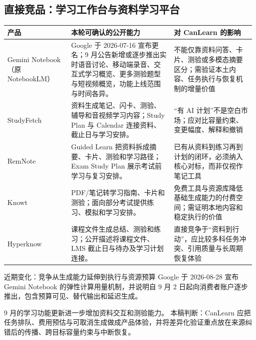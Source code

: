 \documentclass[UTF8,a4paper,11pt,fontset=none]{ctexart}
\newcommand{\cth}[1]{\textbf{\sffamily #1}}
\newcommand{\cont}[1]{\clearpage\noindent{\small\sffamily\color{Muted}#1}\par\vspace{3pt}}
\newenvironment{tbl}{\par\vspace{3pt}\small\noindent\ignorespaces}{\unskip\par\vspace{5pt}}
\begin{document}
\subsection{直接竞品：学习工作台与资料学习平台}
\begin{tbl}
\begin{tabularx}{\linewidth}{@{}L{28mm}YY@{}}
\toprule
\cth{产品}&\cth{本轮可确认的公开能力}&\cth{对 CanLearn 的影响}\\\midrule
Gemini Notebook\newline（原 NotebookLM）&Google 于 2026-07-16 宣布更名；9 月公告新增或逐步推出实时语音讨论、移动端录音、交互式学习概览、更多测验题型与短视频概览，功能上线范围与时间各异。\cite{google_rename,google_sept}&不能仅靠资料问答、卡片、测验或多模态摘要区分；需验证本土内容、任务执行与恢复机制的增量价值\\
StudyFetch&资料生成笔记、闪卡、测验、辅导和音视频学习内容；Study Plan 与 Calendar 连接资料、截止日与学习安排。\cite{studyfetch,studyplan}&“有 AI 计划”不是空白市场；应对比容量约束、变更幅度、解释和撤销\\
RemNote&Guided Learn 把资料拆成摘要、卡片、测验和学习路径；Exam Study Plan 展示考试前学习与复习安排。\cite{remnote_guided,remnote_exam}&已有从资料到练习再到计划的闭环，必须纳入核心对标，而非仅视作笔记工具\\
Knowt&PDF/笔记转学习指南、卡片和测验；面向部分考试提供练习、模拟和学习安排。\cite{knowt}&免费工具与资源库降低基础生成能力的付费空间；需证明本地内容和稳定执行的价值\\
Hyperknow&课程文件生成总结、测验和练习；公开描述将课程文件、LMS 截止日与待办及学习计划连接。\cite{hyperknow}&直接竞争于“资料到行动”，应比较多科任务冲突、引用质量与长周期恢复体验\\
\bottomrule
\end{tabularx}
\end{tbl}

\begin{insight}{近期变化：竞争从生成能力延伸到执行与资源预算}
Google 于 2026-08-28 宣布 Gemini Notebook 的弹性计算用量机制，并说明自 9 月 2 日起向消费者账户逐步推出，包含预算可见、替代输出和延迟生成。\cite{google_limits} \par
9 月的学习功能更新进一步增加资料交互和测验能力。\cite{google_sept} 本稿判断：CanLearn 应把任务排队、费用预估与可取消生成做成产品体验，并将差异化验证重点放在来源纠错后的传播、跨目标容量约束与中断恢复。
\end{insight}

\cont{3 / 竞争格局与最新研究（续）}
\end{document}
